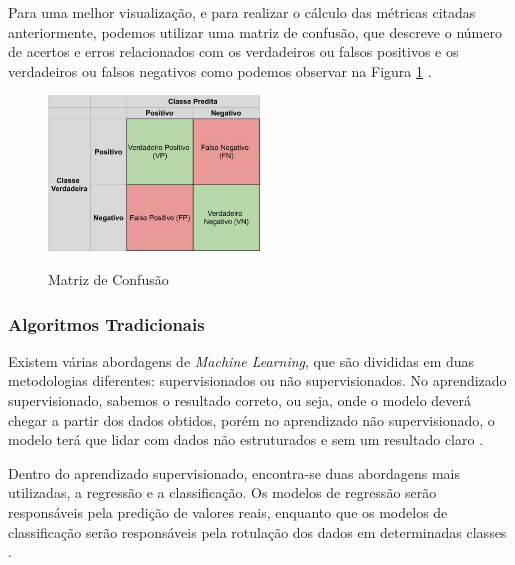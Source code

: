 Para uma melhor visualização, e para realizar o cálculo das métricas citadas anteriormente, podemos utilizar uma matriz de confusão, que descreve o número de acertos e erros relacionados com os verdadeiros ou falsos positivos e os verdadeiros ou falsos negativos como podemos observar na Figura \ref{fig:confusionMatrix} \cite{machineLearningTensorFlow}.

\begin{figure}[!htb]
	\centering
	\caption{Matriz de Confusão}
	\includegraphics[width=0.50\textwidth]{img/confusionMatrix.jpg}
	\label{fig:confusionMatrix}
\end{figure}

\subsubsection{Algoritmos Tradicionais}

Existem várias abordagens de \emph{Machine Learning}, que são divididas em duas metodologias diferentes: supervisionados ou não supervisionados. No aprendizado supervisionado, sabemos o resultado correto, ou seja, onde o modelo deverá chegar a partir dos dados obtidos, porém no aprendizado não supervisionado, o modelo terá que lidar com dados não estruturados e sem um resultado claro \cite{machineLearningPython}.

Dentro do aprendizado supervisionado, encontra-se duas abordagens mais utilizadas, a regressão e a classificação. Os modelos de regressão serão responsáveis pela predição de valores reais, enquanto que os modelos de classificação serão responsáveis pela rotulação dos dados em determinadas classes \cite{machineLearningPython}.


